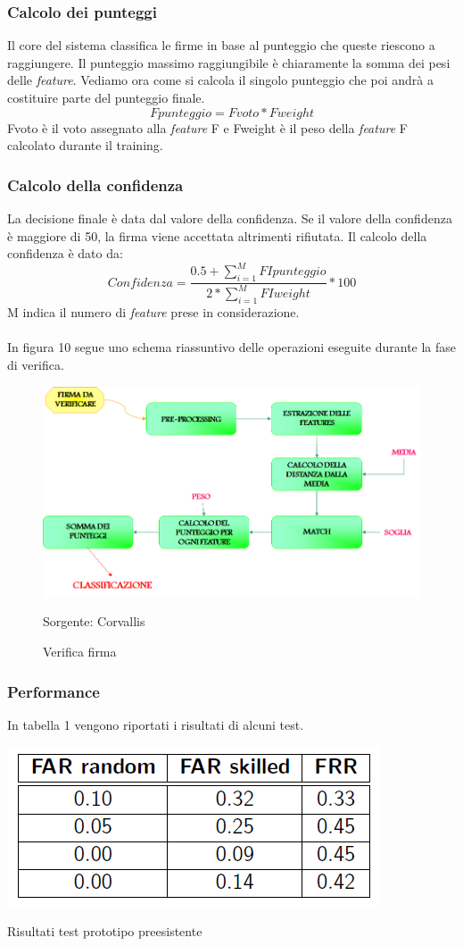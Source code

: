 \subsubsection*{Calcolo dei punteggi}
\label{2.1.4.4}
Il core del sistema classifica le firme in base al punteggio che queste riescono a raggiungere. Il punteggio massimo raggiungibile è chiaramente la somma dei pesi delle \emph{feature}. Vediamo ora come si calcola il singolo punteggio che poi andrà a costituire parte del punteggio finale.
\[Fpunteggio=Fvoto * Fweight\]
Fvoto è il voto assegnato alla \emph{feature} F e Fweight è il peso della \emph{feature} F calcolato durante il training.
\subsubsection*{Calcolo della confidenza}
\label{2.1.4.5}
La decisione finale è data dal valore della confidenza. Se il valore della confidenza è maggiore di 50, la firma viene accettata altrimenti rifiutata. Il calcolo della confidenza è dato da:
\[Confidenza = \frac{0.5+\sum\limits_{i=1}^M FIpunteggio}{2*\sum\limits_{i=1}^M FIweight} * 100\]
M indica il numero di \emph{feature} prese in considerazione.\\\\
In figura 10 segue uno schema riassuntivo delle operazioni eseguite durante la fase di verifica.
\begin{figure}[H]
\centering
\includegraphics[scale=0.5]{../Logo&Header/verificaFirma.png}
\caption{Verifica firma}Sorgente: Corvallis
\end{figure}
\subsubsection*{Performance}
\label{2.1.4.6}
In tabella 1 vengono riportati i risultati di alcuni test.
\begin{table}[H]
  \label{tbl:excel-table}
  \centering
  \includegraphics[scale=0.7]{../Logo&Header/overallResult.png}
  \caption{Risultati test prototipo preesistente}
\end{table}
